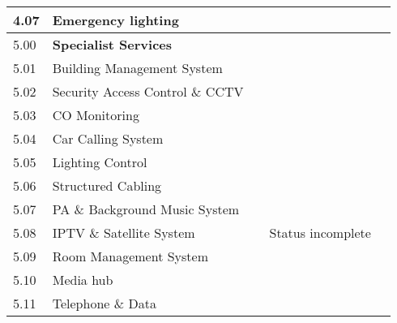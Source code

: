 \begin{fullwidth}
\begin{longtable}{@{}lp{2.8cm} c l p{3.2cm} }
4.07   & Emergency lighting &&& \\	
\midrule
5.00	&\textbf{Specialist Services}&&\\

5.01	&Building Management System	&&& \\	

5.02	&Security Access Control \& CCTV	&& &\\	

5.03	&CO Monitoring		&&&\\

5.04	&Car Calling System		&&&\\

5.05	&Lighting Control		&&&\\

5.06	&Structured Cabling		&&&\\

5.07	&PA \& Background Music System &&&\\		

5.08	&IPTV \& Satellite System	&&Status incomplete& \\	
5.09	&Room Management System	&&& \\
5.10 &Media hub && & \\
5.11 &Telephone \& Data &&&\\

\bottomrule
\end{longtable}
\end{fullwidth}


